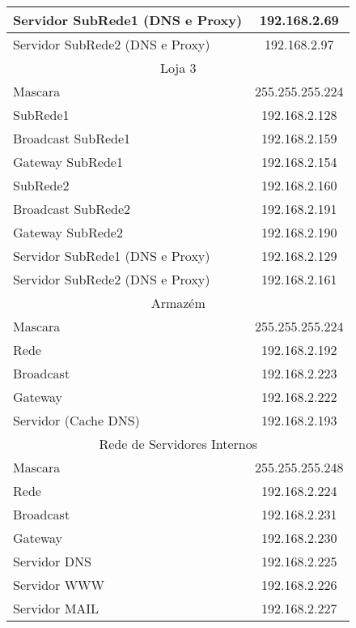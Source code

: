 \documentclass[a4paper,12pt]{article}
\begin{document}
\begin{table}[ht]
\begin{tabular}{ l | c }
						Servidor SubRede1 (DNS e Proxy) & 192.168.2.69 \\\hline
						Servidor SubRede2 (DNS e Proxy) & 192.168.2.97 \\\hline
						
						\multicolumn{2}{c}{Loja 3} \\\hline 
						Mascara & 255.255.255.224 \\\hline
						
						SubRede1 & 192.168.2.128 \\\hline 
						Broadcast SubRede1 & 192.168.2.159 \\\hline
						Gateway SubRede1 & 192.168.2.154\\\hline
					
						SubRede2 & 192.168.2.160\\\hline 
						Broadcast SubRede2 & 192.168.2.191 \\\hline
						Gateway SubRede2 & 192.168.2.190 \\\hline
						
						Servidor SubRede1 (DNS e Proxy) & 192.168.2.129 \\\hline
						Servidor SubRede2 (DNS e Proxy) & 192.168.2.161 \\\hline
						
						\multicolumn{2}{c}{Armazém} \\\hline 
						Mascara & 255.255.255.224 \\\hline
						Rede & 192.168.2.192 \\\hline 
						Broadcast & 192.168.2.223 \\\hline 
						Gateway & 192.168.2.222 \\\hline
						Servidor (Cache DNS) & 192.168.2.193 \\\hline
						
						\multicolumn{2}{c}{Rede de Servidores Internos} \\\hline 
						Mascara & 255.255.255.248 \\\hline
						Rede & 192.168.2.224 \\\hline 
						Broadcast & 192.168.2.231 \\\hline 
						Gateway & 192.168.2.230 \\\hline
						Servidor DNS & 192.168.2.225 \\\hline
						Servidor WWW & 192.168.2.226 \\\hline
						Servidor MAIL & 192.168.2.227 \\\hline
						

\end{tabular}
\end{table}
\end{document}
